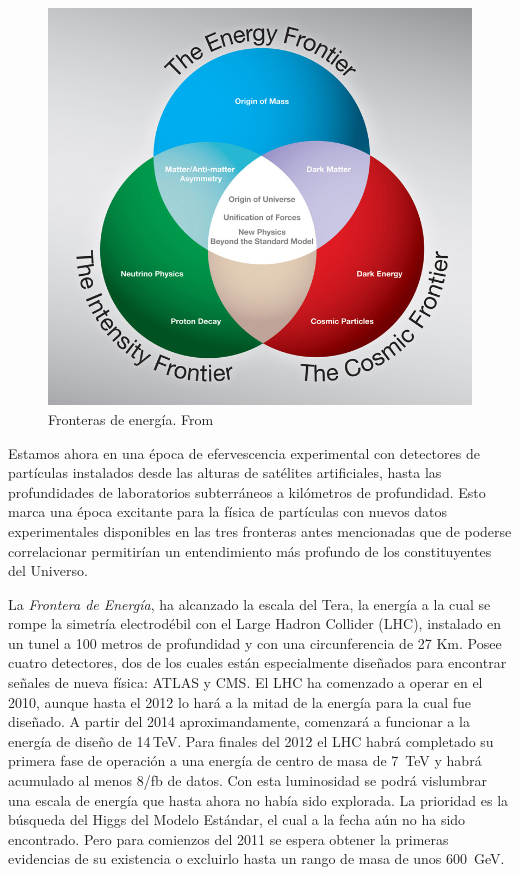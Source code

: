\begin{figure}
  \centering
\includegraphics[scale=0.3]{three-frontiers-large}
  \caption{Fronteras de energía. From \cite{fermilab}}
  \label{fig:1}
\end{figure}

Estamos ahora en una época de efervescencia experimental con
detectores de partículas instalados desde las alturas de satélites
artificiales, hasta las profundidades de laboratorios subterráneos a
kilómetros de profundidad. Esto marca una época excitante para la
física de partículas con nuevos datos experimentales disponibles en
las tres fronteras antes mencionadas que de poderse correlacionar
permitirían un entendimiento más profundo de los constituyentes del
Universo.  

La \emph{Frontera de Energía}, ha alcanzado la escala del Tera, la energía a
la cual se rompe la simetría electrodébil con el Large Hadron Collider
(LHC), instalado en un tunel a 100 metros de profundidad y con una
circunferencia de 27 Km.  Posee cuatro detectores, dos de los cuales
están especialmente diseñados para encontrar señales de nueva física:
ATLAS y CMS. El LHC ha comenzado a operar en el 2010, aunque hasta el
2012 lo hará a la mitad de la energía para la cual fue diseñado. A
partir del 2014 aproximandamente, comenzará a funcionar a la energía
de diseño de 14\,TeV. Para finales del 2012 el LHC habrá completado su
primera fase de operación a una energía de centro de masa de 7~TeV y
habrá acumulado al menos 8/fb de datos. Con esta luminosidad se podrá
vislumbrar una escala de energía que hasta ahora no había sido
explorada. La prioridad es la búsqueda del Higgs del Modelo Estándar,
el cual a la fecha aún no ha sido encontrado. Pero para comienzos del
2011 se espera obtener la primeras evidencias de su existencia o
excluirlo hasta un rango de masa de unos 600~GeV.

